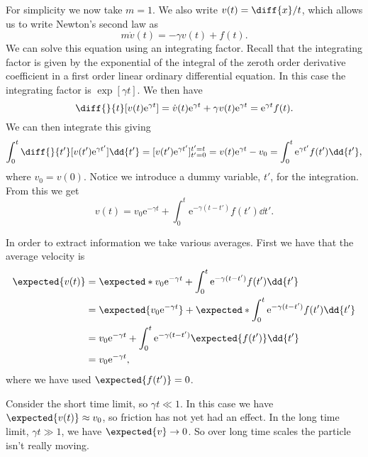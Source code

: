 \documentclass[fleqn]{NotesClass}
\newcommand*{\e}{\mathrm{e}}
\begin{document}
    For simplicity we now take \(m = 1\).
    We also write \(v(t) = \diff{x}/{t}\), which allows us to write Newton's second law as
    \begin{equation}
        m\dot{v}(t) = -\gamma v(t) + f(t).
    \end{equation}
    We can solve this equation using an integrating factor.
    Recall that the integrating factor is given by the exponential of the integral of the zeroth order derivative coefficient in a first order linear ordinary differential equation.
    In this case the integrating factor is \(\exp[\gamma t]\).
    We then have
    \begin{equation}
        \diff{}{t} [v(t)\e^{\gamma t}] = \dot{v}(t)\e^{\gamma t} + \gamma v(t)\e^{\gamma t} = \e^{\gamma t}f(t).
    \end{equation}
    We can then integrate this giving
    \begin{equation}
        \int_0^t \diff{}{t'} [v(t')\e^{\gamma t'}] \dd{t'} = [v(t')\e^{\gamma t'}]_{t'=0}^{t'=t} = v(t)\e^{\gamma t} - v_0 = \int_0^t \e^{\gamma t'}f(t') \dd{t'},
    \end{equation}
    where \(v_0 = v(0)\).
    Notice we introduce a dummy variable, \(t'\), for the integration.
    From this we get
    \begin{equation}
        v(t) = v_0\e^{-\gamma t} + \int_0^t \e^{-\gamma(t - t')}f(t') \dd{t'}.
    \end{equation}

    In order to extract information we take various averages.
    First we have that the average velocity is
    \begin{align}
        \expected{v(t)} &= \expected*{v_0\e^{-\gamma t} + \int_0^t \e^{-\gamma(t - t')}f(t') \dd{t'}}\\
        &= \expected{v_0\e^{-\gamma t}} + \expected*{\int_0^t \e^{-\gamma(t - t')} f(t') \dd{t'}}\\
        &= v_0\e^{-\gamma t} + \int_0^t \e^{-\gamma(t - t')} \expected{f(t')} \dd{t'}\\
        &= v_0\e^{-\gamma t},
    \end{align}
    where we have used \(\expected{f(t')} = 0\).
    
    Consider the short time limit, so \(\gamma t \ll 1\).
    In this case we have \(\expected{v(t)} \approx v_0\), so friction has not yet had an effect.
    In the long time limit, \(\gamma t \gg 1\), we have \(\expected{v} \to 0\).
    So over long time scales the particle isn't really moving.
    
\end{document}
